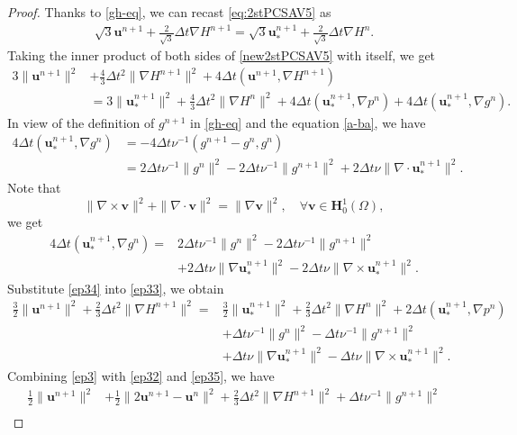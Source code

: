 \documentclass[12pt,reqno]{amsart}
\numberwithin{equation}{section}
\newcommand{\uu}{\mathrm{\textbf{u}}}
\newcommand{\vv}{\mathrm{\textbf{v}}}
\begin{document}
\begin{proof}
Thanks to \eqref{gh-eq}, we can recast \eqref{eq:2stPCSAV5} as
\begin{align}\label{new2stPCSAV5}
\sqrt{3}\uu^{n+1}+\frac{2}{\sqrt{3}}\Delta t\nabla H^{n+1}=\sqrt{3}\uu_*^{n+1}+\frac{2}{\sqrt{3}}\Delta t\nabla H^{n}.
\end{align}
Taking the inner product of both sides of \eqref{new2stPCSAV5} with itself, we get
\begin{align}\label{ep33}
3\|\uu^{n+1}\|^2&+\frac{4}{3}\Delta t^2\|\nabla H^{n+1}\|^2+4\Delta t\left(\uu^{n+1},\nabla H^{n+1}\right)\\
&=3\|\uu_*^{n+1}\|^2+\frac{4}{3}\Delta t^2\|\nabla H^{n}\|^2+4\Delta t\left(\uu_*^{n+1},\nabla p^{n}\right)+4\Delta t\left(\uu_*^{n+1},\nabla g^{n}\right)\nonumber.
\end{align}
In view of the definition of $g^{n+1}$ in \eqref{gh-eq} and the equation \eqref{a-ba}, we have 
\begin{align}
4\Delta t\left(\uu_*^{n+1},\nabla g^{n}\right)&=-4\Delta t\nu^{-1}\left(g^{n+1}-g^n,g^n\right)\nonumber\\
&=2\Delta t\nu^{-1}\|g^n\|^2-2\Delta t\nu^{-1}\|g^{n+1}\|^2+2\Delta t\nu\|\nabla\cdot\uu_*^{n+1}\|^2.\nonumber
\end{align}
Note that 
$$\|\nabla\times\vv\|^2+\|\nabla\cdot\vv\|^2=\|\nabla\vv\|^2,\quad\forall\vv\in \mathbf{H}_0^1(\Omega),$$
we get
\begin{align}\label{ep34}
4\Delta t\left(\uu_*^{n+1},\nabla g^{n}\right)
=&2\Delta t\nu^{-1}\|g^n\|^2-2\Delta t\nu^{-1}\|g^{n+1}\|^2\\
&+2\Delta t\nu\|\nabla\uu_*^{n+1}\|^2-2\Delta t\nu\|\nabla\times\uu_*^{n+1}\|^2.\nonumber
\end{align}
Substitute \eqref{ep34} into \eqref{ep33}, we obtain 
\begin{align}\label{ep35}
\frac{3}{2}\|\uu^{n+1}\|^2+\frac{2}{3}\Delta t^2\|\nabla H^{n+1}\|^2
=&\frac{3}{2}\|\uu_*^{n+1}\|^2+\frac{2}{3}\Delta t^2\|\nabla H^{n}\|^2
+2\Delta t\left(\uu_*^{n+1},\nabla p^{n}\right)\nonumber\\
&+\Delta t\nu^{-1}\|g^n\|^2-\Delta t\nu^{-1}\|g^{n+1}\|^2\\
&+\Delta t\nu\|\nabla\uu_*^{n+1}\|^2-\Delta t\nu\|\nabla\times\uu_*^{n+1}\|^2\nonumber.
\end{align}
Combining \eqref{ep3} with \eqref{ep32} and \eqref{ep35}, we have
\begin{align}\label{ep5}
\frac{1}{2}\|\uu^{n+1}\|^2&+\frac{1}{2}\|2\uu^{n+1}-\uu^n\|^2+\frac{2}{3}\Delta t^2\|\nabla H^{n+1}\|^2+\Delta t\nu^{-1}\|g^{n+1}\|^2\nonumber\\

\end{align}
\end{proof}
\end{document}
